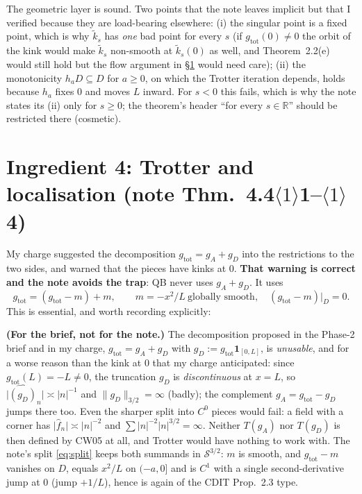 \documentclass[11pt]{article}
\newcommand{\nrm}[1]{\lVert #1\rVert}
\newcommand{\abz}[1]{\lvert #1\rvert}
\newcommand{\gtot}{g_{\mathrm{tot}}}
\newcommand{\ktil}{\widetilde k}
\begin{document}
\begin{verdictok}
The geometric layer is sound.  Two points that the note leaves implicit but that I verified because they are
load-bearing elsewhere: (i) the singular point is a fixed point, which is why $\ktil_s$ has \emph{one} bad point
for every $s$ (if $\gtot(0)\ne0$ the orbit of the kink would make $\ktil_s$ non-smooth at $\ktil_s(0)$ as well,
and Theorem~2.2(e) would still hold but the flow argument in \S\ref{sec:trotter} would need care); (ii) the
monotonicity $h_aD\subseteq D$ for $a\ge0$, on which the Trotter iteration depends, holds because $h_a$ fixes
$0$ and moves $L$ inward.  For $s<0$ this fails, which is why the note states its (ii) only for $s\ge0$; the
theorem's header ``for every $s\in\mathbb R$'' should be restricted there (cosmetic).
\end{verdictok}

\section{Ingredient 4: Trotter and localisation (note Thm.~4.4$\langle1\rangle$1--$\langle1\rangle$4)}
\label{sec:trotter}

My charge suggested the decomposition $\gtot=g_A+g_D$ into the restrictions to the two sides, and warned that
the pieces have kinks at $0$.  \textbf{That warning is correct and the note avoids the trap}: QB never uses
$g_A+g_D$.  It uses
\begin{equation}\label{eq:split}
 \gtot=(\gtot-m)+m,\qquad m=-x^2/L\ \text{globally smooth},\quad (\gtot-m)|_D=0 .
\end{equation}
This is essential, and worth recording explicitly:

\begin{verdictbreak}
\textbf{(For the brief, not for the note.)}  The decomposition proposed in the Phase-2 brief and in my charge,
$\gtot=g_A+g_D$ with $g_D:=\gtot\mathbf 1_{[0,L]}$, is \emph{unusable}, and for a worse reason than the
kink at $0$ that my charge anticipated: since $\gtot(L)=-L\ne0$, the truncation $g_D$ is \emph{discontinuous}
at $x=L$, so $\abz{\widehat{(g_D)}_n}\asymp\abz n^{-1}$ and $\nrm{g_D}_{3/2}=\infty$ (badly); the complement
$g_A=\gtot-g_D$ jumps there too.  Even the sharper split into $C^0$ pieces would fail: a field with a corner has
$\abz{\hat f_n}\asymp\abz n^{-2}$ and $\sum\abz n^{-2}\abz n^{3/2}=\infty$.  Neither $T(g_A)$ nor $T(g_D)$ is
then defined by CW05 at all, and Trotter would have nothing to work with.
The note's split \eqref{eq:split} keeps both summands in $\mathcal S^{3/2}$: $m$ is smooth, and $\gtot-m$
vanishes on $D$, equals $x^2/L$ on $(-a,0]$ and is $C^1$ with a single second-derivative jump at $0$
(jump $+1/L$), hence is again of the CDIT Prop.~2.3 type.
\end{verdictbreak}
\end{document}
